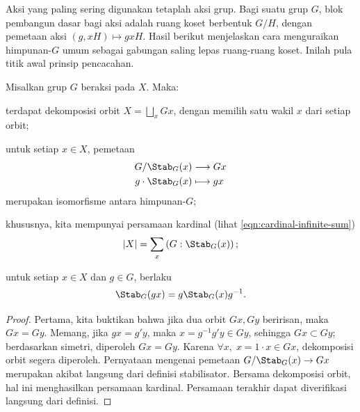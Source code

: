 Aksi yang paling sering digunakan tetaplah aksi grup. Bagi suatu grup $G$, blok pembangun dasar bagi aksi adalah ruang koset berbentuk $G/H$, dengan pemetaan aksi $(g, xH) \mapsto gxH$. Hasil berikut menjelaskan cara menguraikan himpunan-$G$ umum sebagai gabungan saling lepas ruang-ruang koset. Inilah pula titik awal prinsip pencacahan.

\begin{lemma}\label{prop:orbit-decomp}
	Misalkan grup $G$ beraksi pada $X$. Maka:
	\begin{compactenum}[(i)]
		\item terdapat dekomposisi orbit $X = \bigsqcup_x Gx$, dengan memilih satu wakil $x$ dari setiap orbit;
		\item untuk setiap $x \in X$, pemetaan
			\begin{align*}
				G/\Stab_G(x) & \longrightarrow Gx \\
				g \cdot \Stab_G(x) & \longmapsto gx
			\end{align*}
			merupakan isomorfisme antara himpunan-$G$;
		\item khususnya, kita mempunyai persamaan kardinal (lihat \eqref{eqn:cardinal-infinite-sum})
			\[ |X| = \sum_x \left( G: \Stab_G(x) \right); \]
		\item untuk setiap $x \in X$ dan $g \in G$, berlaku
			\[ \Stab_G(gx) = g \Stab_G(x) g^{-1}. \]
	\end{compactenum}
\end{lemma}
\begin{proof}
	Pertama, kita buktikan bahwa jika dua orbit $Gx, Gy$ beririsan, maka $Gx=Gy$. Memang, jika $gx=g'y$, maka $x = g^{-1}g' y \in Gy$, sehingga $Gx \subset Gy$; berdasarkan simetri, diperoleh $Gx=Gy$. Karena $\forall x, \; x = 1\cdot x \in Gx$, dekomposisi orbit segera diperoleh. Pernyataan mengenai pemetaan $G/\Stab_G(x) \to Gx$ merupakan akibat langsung dari definisi stabilisator. Bersama dekomposisi orbit, hal ini menghasilkan persamaan kardinal. Persamaan terakhir dapat diverifikasi langsung dari definisi.
\end{proof}


